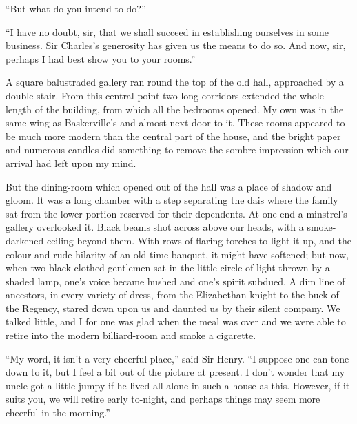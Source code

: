 \documentclass[paper=5.5in:8.5in,BCOR=7mm,twoside,DIV=calc,12pt,usegeometry,openany,chapterprefix,endperiod,headings=big]{scrbook} %
\begin{document}
\enquote{But what do you intend to do?}

\enquote{I have no doubt, sir, that we shall succeed in establishing ourselves in some business. Sir Charles's generosity has given us the means to do so. And now, sir, perhaps I had best show you to your rooms.}

A square balustraded gallery ran round the top of the old hall, approached by a double stair. From this central point two long corridors extended the whole length of the building, from which all the bedrooms opened. My own was in the same wing as Baskerville's and almost next door to it. These rooms appeared to be much more modern than the central part of the house, and the bright paper and numerous candles did something to remove the sombre impression which our arrival had left upon my mind.

But the dining-room which opened out of the hall was a place of shadow and gloom. It was a long chamber with a step separating the dais where the family sat from the lower portion reserved for their dependents. At one end a minstrel's gallery overlooked it. Black beams shot across above our heads, with a smoke-darkened ceiling beyond them. With rows of flaring torches to light it up, and the colour and rude hilarity of an old-time banquet, it might have softened; but now, when two black-clothed gentlemen sat in the little circle of light thrown by a shaded lamp, one's voice became hushed and one's spirit subdued. A dim line of ancestors, in every variety of dress, from the Elizabethan knight to the buck of the Regency, stared down upon us and daunted us by their silent company. We talked little, and I for one was glad when the meal was over and we were able to retire into the modern billiard-room and smoke a cigarette.

\enquote{My word, it isn't a very cheerful place,} said Sir Henry. \enquote{I suppose one can tone down to it, but I feel a bit out of the picture at present. I don't wonder that my uncle got a little jumpy if he lived all alone in such a house as this. However, if it suits you, we will retire early to-night, and perhaps things may seem more cheerful in the morning.}
\end{document}

